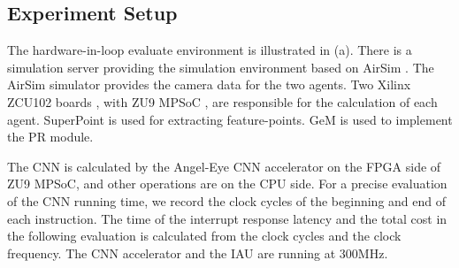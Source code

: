 \label{sec:experiments}







\subsection{ Experiment Setup }

The hardware-in-loop evaluate environment is illustrated in (a). There is a simulation server providing the simulation environment based on AirSim \cite{shah2018airsim}. The AirSim simulator provides the camera data for the two agents. Two Xilinx ZCU102 boards \cite{zcu102}, with ZU9 MPSoC \cite{MPSoC}, are responsible for the calculation of each agent.
SuperPoint \cite{detone2018superpoint} is used for extracting feature-points. GeM \cite{radenovic2018fine} is used to implement the PR module.

The CNN is calculated by the Angel-Eye CNN accelerator \cite{guo2017angel} on the FPGA side of ZU9 MPSoC, and other operations are on the CPU side.
For a precise evaluation of the CNN running time, we record the clock cycles of the beginning and end of each instruction. The time of the interrupt response latency and the total cost in the following evaluation is calculated from the clock cycles and the clock frequency. The CNN accelerator and the IAU are running at 300MHz.


 
